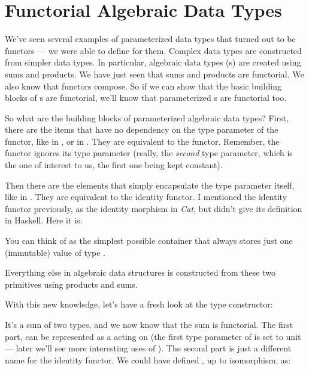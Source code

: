 \section{Functorial Algebraic Data Types}

We've seen several examples of parameterized data types that turned out
to be functors --- we were able to define  for them.
Complex data types are constructed from simpler data types. In
particular, algebraic data types (s) are created using sums and
products. We have just seen that sums and products are functorial. We
also know that functors compose. So if we can show that the basic
building blocks of s are functorial, we'll know that parameterized
s are functorial too.

So what are the building blocks of parameterized algebraic data types?
First, there are the items that have no dependency on the type parameter
of the functor, like  in , or 
in . They are equivalent to the  functor.
Remember, the  functor ignores its type parameter (really,
the \emph{second} type parameter, which is the one of interest to us,
the first one being kept constant).

Then there are the elements that simply encapsulate the type parameter
itself, like  in . They are equivalent to the
identity functor. I mentioned the identity functor previously, as the
identity morphism in \emph{Cat}, but didn't give its definition in
Haskell. Here it is:


You can think of  as the simplest possible container
that always stores just one (immutable) value of type .

Everything else in algebraic data structures is constructed from these
two primitives using products and sums.

With this new knowledge, let's have a fresh look at the 
type constructor:

It's a sum of two types, and we now know that the sum is functorial. The
first part,  can be represented as a 
acting on  (the first type parameter of  is set
to unit --- later we'll see more interesting uses of ).
The second part is just a different name for the identity functor. We
could have defined , up to isomorphism, as:

